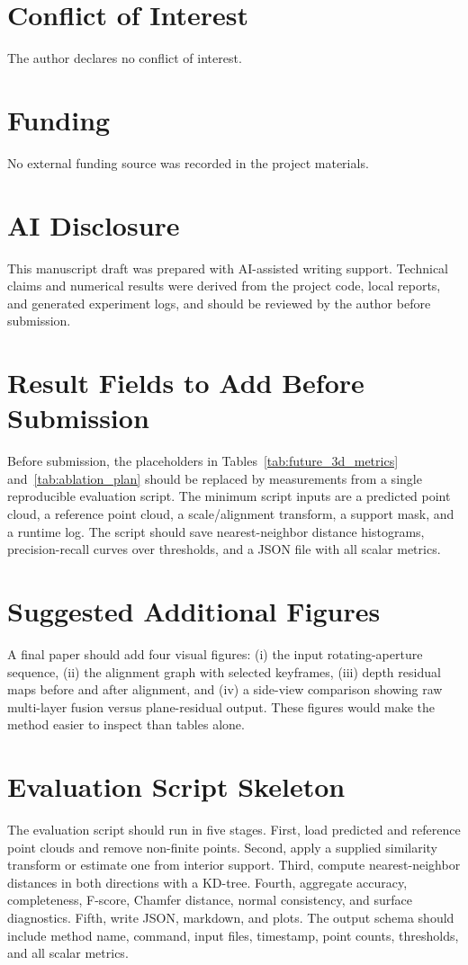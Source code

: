 \documentclass[conference]{IEEEtran}
\begin{document}
\section*{Conflict of Interest}
The author declares no conflict of interest.

\section*{Funding}
No external funding source was recorded in the project materials.

\section*{AI Disclosure}
This manuscript draft was prepared with AI-assisted writing support. Technical claims and numerical results were derived from the project code, local reports, and generated experiment logs, and should be reviewed by the author before submission.

\appendices
\section{Result Fields to Add Before Submission}
Before submission, the placeholders in Tables~\ref{tab:future_3d_metrics} and~\ref{tab:ablation_plan} should be replaced by measurements from a single reproducible evaluation script. The minimum script inputs are a predicted point cloud, a reference point cloud, a scale/alignment transform, a support mask, and a runtime log. The script should save nearest-neighbor distance histograms, precision-recall curves over thresholds, and a JSON file with all scalar metrics.

\section{Suggested Additional Figures}
A final paper should add four visual figures: (i) the input rotating-aperture sequence, (ii) the alignment graph with selected keyframes, (iii) depth residual maps before and after alignment, and (iv) a side-view comparison showing raw multi-layer fusion versus plane-residual output. These figures would make the method easier to inspect than tables alone.

\section{Evaluation Script Skeleton}
The evaluation script should run in five stages. First, load predicted and reference point clouds and remove non-finite points. Second, apply a supplied similarity transform or estimate one from interior support. Third, compute nearest-neighbor distances in both directions with a KD-tree. Fourth, aggregate accuracy, completeness, F-score, Chamfer distance, normal consistency, and surface diagnostics. Fifth, write JSON, markdown, and plots. The output schema should include method name, command, input files, timestamp, point counts, thresholds, and all scalar metrics.
\end{document}
